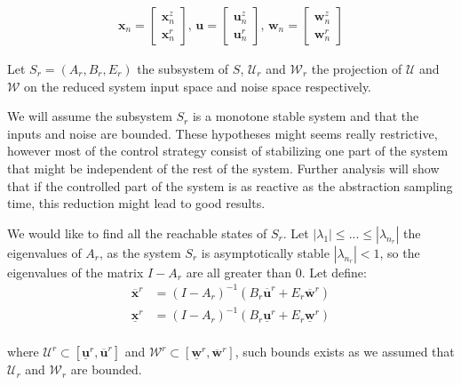 \documentclass{article}
\theoremstyle{named}
\begin{document}
\begin{align*}
\mathbf{x}_n = \begin{bmatrix}
\mathbf{x}^z_n\\
\mathbf{x}^r_n
\end{bmatrix}
\textrm{, }
\mathbf{u} = \begin{bmatrix}
\mathbf{u}^z_n\\
\mathbf{u}^r_n
\end{bmatrix}
\textrm{, }
\mathbf{w}_n = \begin{bmatrix}
\mathbf{w}^z_n\\
\mathbf{w}^r_n
\end{bmatrix}
\end{align*}

Let $S_r=(A_r,B_r,E_r)$ the subsystem of $S$, $\mathcal{U}_r$ and $\mathcal{W}_r$ the projection of $\mathcal{U}$ and $\mathcal{W}$ on the reduced system input space and noise space respectively.

We will assume the subsystem $S_r$ is a monotone stable system and that the inputs and noise are bounded.
These hypotheses might seems really restrictive, however most of the control strategy consist of stabilizing one part of the system that might be independent of the rest of the system.
Further analysis will show that if the controlled part of the system is as reactive as the abstraction sampling time, this reduction might lead to good results.

We would like to find all the reachable states of $S_r$.
Let $|\lambda_1| \leq ... \leq |\lambda_{n_r}|$ the eigenvalues of $A_r$, as the system $S_r$ is asymptotically stable $|\lambda_{n_r}|<1$,
so the eigenvalues of the matrix $I-A_r$ are all greater than 0.
Let define:
\begin{equation}
\begin{split}
\overline{\mathbf{x}}^r &= (I-A_r)^{-1} (B_r \overline{\mathbf{u}}^r + E_r \overline{\mathbf{w}}^r)\\
\underline{\mathbf{x}}^r &= (I-A_r)^{-1} (B_r \underline{\mathbf{u}}^r + E_r \underline{\mathbf{w}}^r)\\
\end{split}
\end{equation}

where $\mathcal{U}^r \subset \left [\underline{\mathbf{u}}^r, \overline{\mathbf{u}}^r \right ]$ and $\mathcal{W}^r \subset \left [\underline{\mathbf{w}}^r, \overline{\mathbf{w}}^r \right ]$, such bounds exists as we assumed that $\mathcal{U}_r$ and $\mathcal{W}_r$ are bounded.
\end{document}
